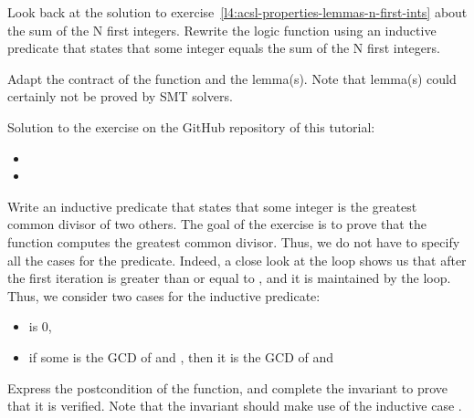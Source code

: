 



Look back at the solution to
exercise~\ref{l4:acsl-properties-lemmas-n-first-ints} about the sum of the N
first integers. Rewrite the logic function using an inductive predicate that
states that some integer equals the sum of the N first integers.




Adapt the contract of the function and the lemma(s). Note that lemma(s) could
certainly not be proved by SMT solvers.


\begin{Information}
  Solution to the exercise on the GitHub repository of this tutorial:
  \begin{itemize}
    \item {}
    \item {}
  \end{itemize}
\end{Information}




Write an inductive predicate that states that some integer is the greatest common
divisor of two others. The goal of the exercise is to prove that the function
 computes the greatest common divisor. Thus, we do not have to
specify all the cases for the predicate. Indeed, a close look at the loop shows
us that after the first iteration  is greater than or equal to
, and it is maintained by the loop. Thus, we consider two cases for
the inductive predicate:


\begin{itemize}
\item {} is 0,
\item if some  is the GCD of  and ,
  then it is the GCD of  and 
\end{itemize}




Express the postcondition of the function, and complete the invariant to prove
that it is verified. Note that the invariant should make use of the inductive
case .




